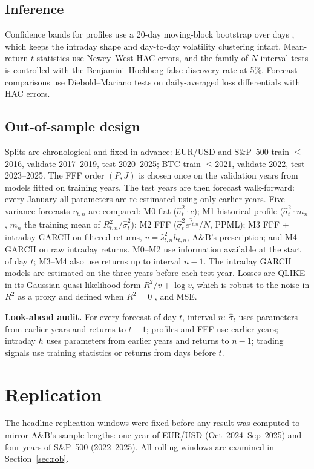 \documentclass[11pt,a4paper]{article}
\begin{document}
\subsection{Inference}
Confidence bands for profiles use a 20-day moving-block bootstrap over days \citep{Kunsch1989}, which keeps the intraday shape and day-to-day volatility clustering intact. Mean-return $t$-statistics use Newey--West HAC errors, and the family of $N$ interval tests is controlled with the Benjamini--Hochberg false discovery rate at 5\%. Forecast comparisons use Diebold--Mariano tests on daily-averaged loss differentials with HAC errors.

\subsection{Out-of-sample design}
\label{sec:oosdesign}
Splits are chronological and fixed in advance: EUR/USD and S\&P~500 train $\le$2016, validate 2017--2019, test 2020--2025; BTC train $\le$2021, validate 2022, test 2023--2025. The FFF order $(P,J)$ is chosen once on the validation years from models fitted on training years. The test years are then forecast walk-forward: every January all parameters are re-estimated using only earlier years. Five variance forecasts $v_{t,n}$ are compared:
M0 flat ($\hat\sigma_t^2\cdot c$);
M1 historical profile ($\hat\sigma_t^2\cdot m_n$, $m_n$ the training mean of $R^2_{t,n}/\hat\sigma_t^2$);
M2 FFF ($\hat\sigma_t^2 e^{\hat f_{t,n}}/N$, PPML);
M3 FFF + intraday GARCH on filtered returns, $v=\hat s^2_{t,n}h_{t,n}$, A\&B's prescription; and
M4 GARCH on raw intraday returns.
M0--M2 use information available at the start of day $t$; M3--M4 also use returns up to interval $n-1$. The intraday GARCH models are estimated on the three years before each test year. Losses are QLIKE in its Gaussian quasi-likelihood form $R^2/v+\log v$, which is robust to the noise in $R^2$ as a proxy and defined when $R^2=0$ \citep{Patton2011}, and MSE.

\textbf{Look-ahead audit.} For every forecast of day $t$, interval $n$: $\hat\sigma_t$ uses parameters from earlier years and returns to $t-1$; profiles and FFF use earlier years; intraday $h$ uses parameters from earlier years and returns to $n-1$; trading signals use training statistics or returns from days before $t$.

\section{Replication}
\label{sec:rep}
The headline replication windows were fixed before any result was computed to mirror A\&B's sample lengths: one year of EUR/USD (Oct~2024--Sep~2025) and four years of S\&P~500 (2022--2025). All rolling windows are examined in Section~\ref{sec:rob}.
\end{document}
